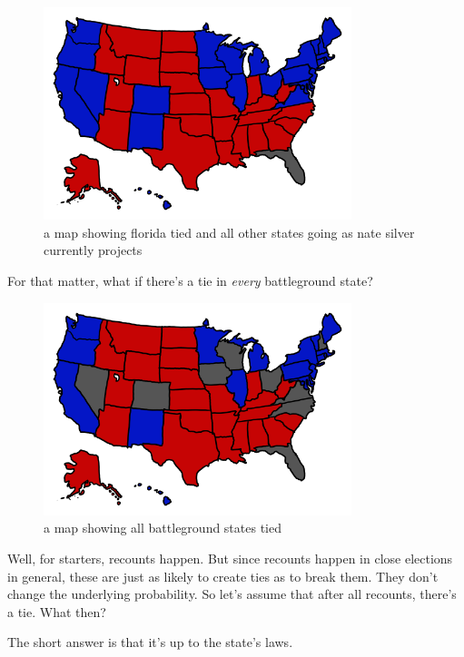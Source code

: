 \begin{figure}[!htbp]
\centering
\includegraphics[scale=0.5, max width=0.8\textwidth]{imgs/a/19/tie_map.png}
\caption{a map showing florida tied and all other states going as nate silver currently projects}
\end{figure}

{For that matter, what if there’s a tie in \emph{every} battleground state?}

\begin{figure}[!htbp]
\centering
\includegraphics[scale=0.5, max width=0.8\textwidth]{imgs/a/19/tie_map_all.png}
\caption{a map showing all battleground states tied}
\end{figure}

{Well, for starters, recounts happen. But since recounts happen in close elections in general, these are just as likely to create ties as to break them. They don’t change the underlying probability. So let’s assume that after all recounts, there’s a tie. What then?}

{The short answer is that it’s up to the state’s laws.}

